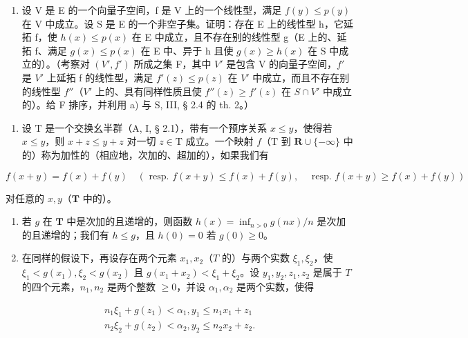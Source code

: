 \begin{enumerate}
\def\labelenumi{\alph{enumi})}
\setcounter{enumi}{1}
\tightlist
\item
  设 V 是 E 的一个向量子空间，f 是 V 上的一个线性型，满足 \(f(y) \leqslant p(y)\) 在 V 中成立。设 S 是 E 的一个非空子集。证明：存在 E 上的线性型 h，它延拓 f，使 \(h(x) \leqslant p(x)\) 在 E 中成立，且不存在别的线性型 g（E 上的、延拓 f、满足 \(g(x) \leqslant p(x)\) 在 E 中、异于 h 且使 \(g(x) \geqslant h(x)\) 在 S 中成立的）。（考察对 \((V', f')\) 所成之集 F，其中 \(V'\) 是包含 V 的向量子空间，\(f'\) 是 \(V'\) 上延拓 f 的线性型，满足 \(f'(z) \leqslant p(z)\) 在 \(V'\) 中成立，而且不存在别的线性型 \(f''\)（\(V'\) 上的、具有同样性质且使 \(f''(z) \geqslant f'(z)\) 在 \(S \cap V'\) 中成立的）。给 F 排序，并利用 a) 与 S, III, § 2.4 的 th. 2。）
\end{enumerate}

\begin{enumerate}
\def\labelenumi{\arabic{enumi})}
\setcounter{enumi}{6}
\tightlist
\item
  设 \(\mathrm{T}\) 是一个交换幺半群（A, I, § 2.1），带有一个预序关系 \(x \leqslant y\)，使得若 \(x \leqslant y\)，则 \(x + z \leqslant y + z\) 对一切 \(z \in \mathrm{T}\) 成立。一个映射 \(f\)（\(\mathrm{T}\) 到 \(\mathbf{R} \cup \{-\infty\}\) 中的）称为加性的（相应地，次加的、超加的），如果我们有
\end{enumerate}

\[
f (x + y) = f (x) + f (y) \quad (\text { resp. } f (x + y) \leqslant f (x) + f (y), \quad \text { resp. } f (x + y) \geqslant f (x) + f (y))
\]

对任意的 \(x, y\)（\(\mathbf{T}\) 中的）。

\begin{enumerate}
\def\labelenumi{\alph{enumi})}
\item
  若 \(g\) 在 \(\mathbf{T}\) 中是次加的且递增的，则函数 \(h(x) = \inf_{n > 0} g(nx) / n\) 是次加的且递增的；我们有 \(h \leqslant g\)，且 \(h(0) = 0\) 若 \(g(0) \geqslant 0\)。
\item
  在同样的假设下，再设存在两个元素 \(x_{1}, x_{2}\)（\(T\) 的）与两个实数 \(\xi_{1}, \xi_{2}\)，使 \(\xi_{1} < g(x_{1}), \xi_{2} < g(x_{2})\) 且 \(g(x_{1} + x_{2}) < \xi_{1} + \xi_{2}\)。设 \(y_{1}, y_{2}, z_{1}, z_{2}\) 是属于 \(T\) 的四个元素，\(n_{1}, n_{2}\) 是两个整数 \(\geqslant 0\)，并设 \(\alpha_{1}, \alpha_{2}\) 是两个实数，使得
\end{enumerate}

\[
\begin{array}{l} n _ {1} \xi_ {1} + g (z _ {1}) <   \alpha_ {1}, y _ {1} \leqslant n _ {1} x _ {1} + z _ {1} \\ n _ {2} \xi_ {2} + g (z _ {2}) <   \alpha_ {2}, y _ {2} \leqslant n _ {2} x _ {2} + z _ {2}. \end{array}
\]


